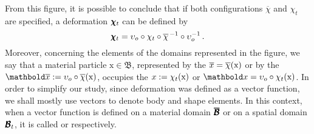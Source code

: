 From this figure, it is possible to conclude that if both configurations $\overline{\chi}$ and $\chi_t$ are specified, a deformation $\pmb{\chi}_t$ can be defined by 
\begin{equation}
\pmb{\chi}_t = \upsilon_o\circ\chi_t\circ\overline{\chi}^{\,-1}\circ\upsilon_o^{-1}\,.
\end{equation}
Moreover, concerning the elements of the domains represented in the figure, we say that a material particle $\text{x}\in\mathfrak{B}$, represented by the  $\overline{x}=\overline{\chi}(\text{x})$ or by the  $\vto{\overline{x}}:=\fua{\upsilon_o\circ\overline{\chi}}{\text{x}}$, occupies the  $x:=\chi_t(\text{x})$ or $\vto{x}=\fua{\upsilon_o\circ\chi_t}{\text{x}}$. In order to simplify our study, since deformation was defined as a vector function, we shall mostly use vectors to denote body and shape elements. In this context, when a vector function is defined on a material domain $\pmb{\overline{\mathcal{B}}}$ or on a spatial domain $\pmb{\mathcal{B}}_t$, it is called  or  respectively. 

